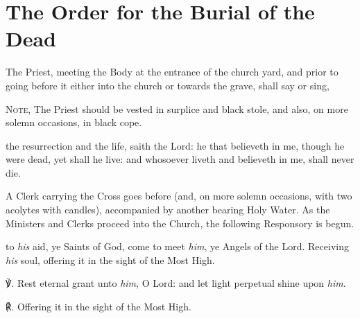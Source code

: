 \fancyhead[RE,LO]{\textit{}}
\section{The Order for the Burial of the Dead}

\begin{secrubric}
    The Priest, meeting the Body at the entrance of the church yard, and prior to going before it either into the church or towards the grave, shall say or sing,\par
    \textsc{Note,} The Priest should be vested in surplice and black stole, and also, on more solemn occasions, in black cope.
\end{secrubric}
 the resurrection and the life, saith the Lord: he that believeth in me, though he were dead, yet shall he live: and whosoever liveth and believeth in me, shall never die.\par

\begin{rubric}
	A Clerk carrying the Cross goes before (and, on more solemn occasions, with two acolytes with candles), accompanied by another bearing Holy Water. As the Ministers and Clerks proceed into the Church, the following Responsory is begun.
\end{rubric}

 to \textit{his} aid, ye Saints of God, come to meet \textit{him}, ye Angels of the Lord. Receiving \textit{his} soul, offering it in the sight of the Most High.\par
{}
℣. Rest eternal grant unto \textit{him}, O Lord: and let light perpetual shine upon \textit{him}.\par
℟. Offering it in the sight of the Most High.

